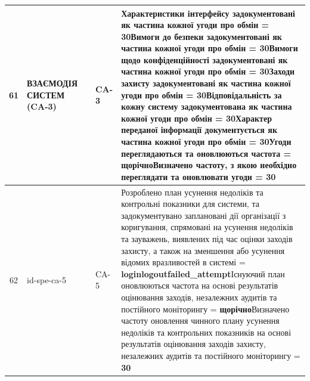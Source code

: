 \documentclass[10pt]{article}
\begin{document}
\begin{longtable}{|c|>{\raggedright\arraybackslash}p{2.5cm}|>{\raggedright\arraybackslash}p{4.5cm}|>{\raggedright\arraybackslash}p{3cm}|>{\raggedright\arraybackslash}p{4.5cm}|}
61 & ВЗАЄМОДІЯ СИСТЕМ (CA-3) &  & CA-3 & Характеристики інтерфейсу задокументовані як частина кожної угоди про обмін = \textbf{30}\newline Вимоги до безпеки задокументовані як частина кожної угоди про обмін = \textbf{30}\newline Вимоги щодо конфіденційності задокументовані як частина кожної угоди про обмін = \textbf{30}\newline Заходи захисту задокументовані як частина кожної угоди про обмін = \textbf{30}\newline Відповідальність за кожну систему задокументована як частина кожної угоди про обмін = \textbf{30}\newline Характер переданої інформації документується як частина кожної угоди про обмін = \textbf{30}\newline Угоди переглядаються та оновлюються частота = \textbf{щорічно}\newline Визначено частоту, з якою необхідно переглядати та оновлювати угоди = \textbf{30} \\ \hline
62 & id-spe-ca-5 &  & CA-5 & Розроблено план усунення недоліків та контрольні показники для системи, та задокументувано заплановані дії організації з коригування, спрямовані на усунення недоліків та зауважень, виявлених під час оцінки заходів захисту, а також на зменшення або усунення відомих вразливостей в системі = \textbf{loginlogoutfailed\_\allowbreak{}attempt}\newline Існуючий план оновлюються частота на основі результатів оцінювання заходів, незалежних аудитів та постійного моніторингу = \textbf{щорічно}\newline Визначено частоту оновлення чинного плану усунення недоліків та контрольних показників на основі результатів оцінювання заходів захисту, незалежних аудитів та постійного моніторингу = \textbf{30} \\ \hline

\end{longtable}
\end{document}
